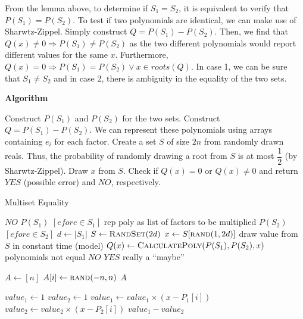 \documentclass{article}
\begin{document}
From the lemma above, to determine if $S_1 = S_2$, it is equivalent to verify that $P(S_1) = P(S_2)$. To test if two
polynomials are identical, we can make use of Sharwtz-Zippel. Simply construct $Q = P(S_1) - P(S_2)$. Then, we find that
$Q(x) \neq 0 \Rightarrow P(S_1) \neq P(S_2)$ as the two different polynomials would report different values for the same
$x$. Furthermore, $Q(x) = 0 \Rightarrow P(S_1) = P(S_2) \lor x \in roots(Q)$. In case 1, we can be sure that $S_1 \neq
S_2$ and in case 2, there is ambiguity in the equality of the two sets.

\textbf{Algorithm}

Construct $P(S_1)$ and $P(S_2)$ for the two sets. Construct $Q = P(S_1) - P(S_2)$. We can represent these polynomials
using arrays containing $e_i$ for each factor. Create a set $S$ of size $2n$ from randomly drawn reals. Thus, the
probability of randomly drawing a root from $S$ is at most $\dfrac{1}{2}$ (by Sharwtz-Zippel). Draw $x$ from $S$. Check
if $Q(x) = 0$ or $Q(x) \neq 0$ and return $YES$ (possible error) and $NO$, respectively.

\begin{algorithm}
    \caption{Multiset Equality}\label{euclid}
    \begin{algorithmic}[1]
         \Return $NO$ \EndIf
        \State $P(S_1)$ \gets $[e for e \in S_1]$  \Comment rep poly as list of factors to be multiplied
        \State $P(S_2)$ \gets $[e for e \in S_2]$
        \State $d \gets |S_1|$
        \State $S \gets \Call{RandSet}{2d}$
        \State $x \gets S[\Call{rand}{1, 2d}]$     \Comment draw value from $S$ in constant time (model)
        \State $Q(x) \gets \Call{CalculatePoly}{P(S_1), P(S_2), x}$
                                 \Comment polynomials not equal
            \State \Return $NO$
        \EndIf
        \State \Return $YES$                        \Comment really a ``maybe''
    \end{algorithmic}

    \begin{algorithmic}[1]
        \State $A \gets [n]$
            \State $A[i] \gets \Call{rand}{-n, n}$
        \EndFor
        \State \Return $A$
    \end{algorithmic}

    \begin{algorithmic}[1]
        \State $value_1 \gets 1$
        \State $value_2 \gets 1$
            \State $value_1 \gets value_1 \times (x - P_1[i])$
            \State $value_2 \gets value_2 \times (x - P_2[i])$
        \EndFor
        \State \Return $value_1 - value_2$
    \end{algorithmic}
\end{algorithm}
\end{document}
